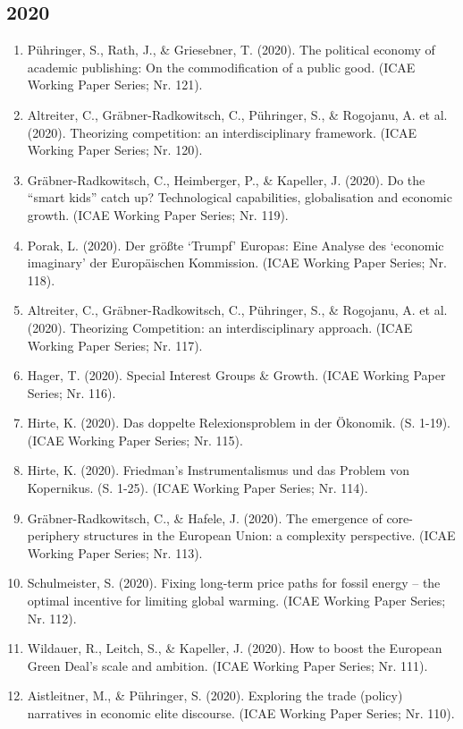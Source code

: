 \subsection*{2020}
\begin{enumerate}
	 \item Pühringer, S., Rath, J., \& Griesebner, T. (2020). The political economy of academic publishing: On the commodification of a public good. (ICAE Working Paper Series; Nr. 121).
	 \item Altreiter, C., Gräbner-Radkowitsch, C., Pühringer, S., \& Rogojanu, A. et al. (2020). Theorizing competition: an interdisciplinary framework. (ICAE Working Paper Series; Nr. 120).
	 \item Gräbner-Radkowitsch, C., Heimberger, P., \& Kapeller, J. (2020). Do the “smart kids” catch up? Technological capabilities, globalisation and economic growth. (ICAE Working Paper Series; Nr. 119).
	 \item Porak, L. (2020). Der größte ‘Trumpf’ Europas: Eine Analyse des ‘economic imaginary’ der Europäischen Kommission. (ICAE Working Paper Series; Nr. 118).
	 \item Altreiter, C., Gräbner-Radkowitsch, C., Pühringer, S., \& Rogojanu, A. et al. (2020). Theorizing Competition: an interdisciplinary approach. (ICAE Working Paper Series; Nr. 117).
	 \item Hager, T. (2020). Special Interest Groups \& Growth. (ICAE Working Paper Series; Nr. 116).
	 \item Hirte, K. (2020). Das doppelte Relexionsproblem in der Ökonomik. (S. 1-19). (ICAE Working Paper Series; Nr. 115).
	 \item Hirte, K. (2020). Friedman’s Instrumentalismus und das Problem von Kopernikus. (S. 1-25). (ICAE Working Paper Series; Nr. 114).
	 \item Gräbner-Radkowitsch, C., \& Hafele, J. (2020). The emergence of core-periphery structures in the European Union: a complexity perspective. (ICAE Working Paper Series; Nr. 113).
	 \item Schulmeister, S. (2020). Fixing long-term price paths for fossil energy – the optimal incentive for limiting global warming. (ICAE Working Paper Series; Nr. 112).
	 \item Wildauer, R., Leitch, S., \& Kapeller, J. (2020). How to boost the European Green Deal’s scale and ambition. (ICAE Working Paper Series; Nr. 111).
	 \item Aistleitner, M., \& Pühringer, S. (2020). Exploring the trade (policy) narratives in economic elite discourse. (ICAE Working Paper Series; Nr. 110).

\end{enumerate}

